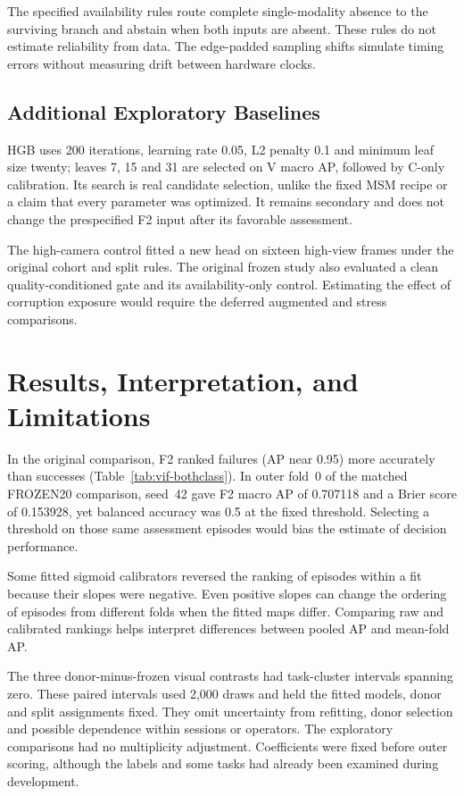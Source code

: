 The specified availability rules route complete single-modality absence to the surviving
branch and abstain when both inputs are absent. These rules do not estimate reliability
from data. The edge-padded sampling shifts simulate timing errors without measuring
drift between hardware clocks.

\subsection{Additional Exploratory Baselines}
HGB uses 200 iterations, learning rate 0.05, L2 penalty 0.1 and minimum leaf size
twenty; leaves 7, 15 and 31 are selected on V macro AP, followed by C-only calibration.
Its search is real candidate selection, unlike the fixed MSM recipe or a claim that
every parameter was optimized. It remains secondary and does not change the prespecified
F2 input after its favorable assessment.

The high-camera control fitted a new head on sixteen high-view frames under the original
cohort and split rules. The original frozen study also evaluated a clean
quality-conditioned gate and its availability-only control. Estimating the effect of
corruption exposure would require the deferred augmented and stress
comparisons.

\section{Results, Interpretation, and Limitations}
In the original comparison, F2 ranked failures (AP near 0.95) more accurately than
successes (Table~\ref{tab:vif-bothclass}). In outer fold~0 of the matched FROZEN20
comparison, seed~42 gave F2 macro AP of 0.707118 and a Brier score of 0.153928, yet
balanced accuracy was 0.5 at the fixed threshold. Selecting a threshold on those same
assessment episodes would bias the estimate of decision performance.

Some fitted sigmoid calibrators reversed the ranking of episodes within a fit because
their slopes were negative. Even positive slopes can change the ordering of episodes
from different folds when the fitted maps differ. Comparing raw and calibrated rankings
helps interpret differences between pooled AP and mean-fold AP.

The three donor-minus-frozen visual contrasts had task-cluster intervals spanning zero.
These paired intervals used 2,000 draws and held the fitted models, donor and split
assignments fixed. They omit uncertainty from refitting, donor selection and possible
dependence within sessions or operators. The exploratory comparisons had no multiplicity
adjustment. Coefficients were fixed before outer scoring, although the labels and some
tasks had already been examined during development.

